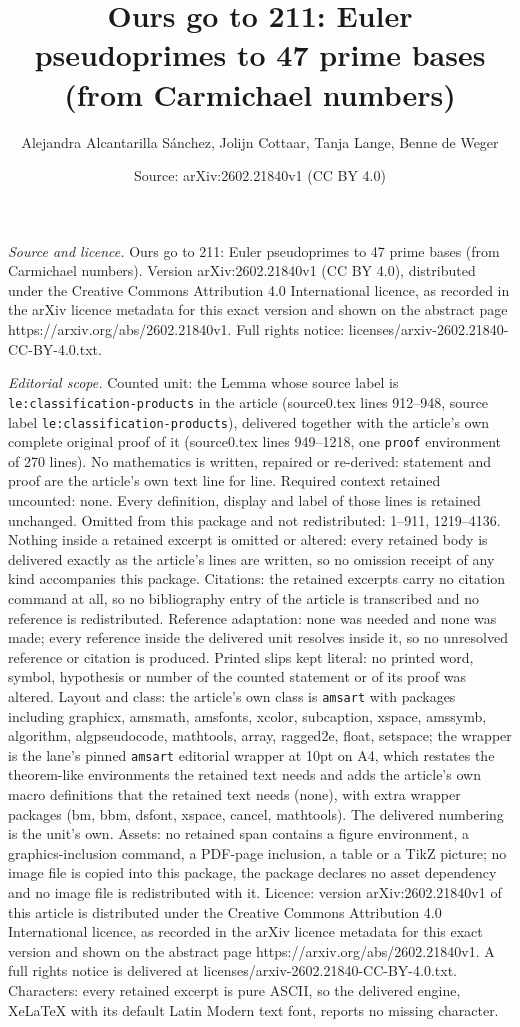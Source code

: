 \documentclass[10pt,a4paper]{amsart}
\title[Ours go to 211: Euler pseudoprimes to 47 prime bases (from C]{Ours go to 211: Euler pseudoprimes to 47 prime bases (from Carmichael numbers)}
\author{Alejandra Alcantarilla S\'anchez, Jolijn Cottaar, Tanja Lange, Benne de Weger}
\date{Source: arXiv:2602.21840v1 (CC BY 4.0)}
\begin{document}
\maketitle

\noindent\emph{Source and licence.} Ours go to 211: Euler pseudoprimes to 47 prime bases (from Carmichael numbers). Version arXiv:2602.21840v1 (CC BY 4.0), distributed under the Creative Commons Attribution 4.0 International licence, as recorded in the arXiv licence metadata for this exact version and shown on the abstract page https://arxiv.org/abs/2602.21840v1. Full rights notice: licenses/arxiv-2602.21840-CC-BY-4.0.txt.\par\smallskip

\noindent\textit{Editorial scope.} Counted unit: the Lemma whose source label is \texttt{le:classification-products} in the article (source0.tex lines 912--948, source label \texttt{le:classification-products}), delivered together with the article's own complete original proof of it (source0.tex lines 949--1218, one \texttt{proof} environment of 270 lines). No mathematics is written, repaired or re-derived: statement and proof are the article's own text line for line. Required context retained uncounted: none. Every definition, display and label of those lines is retained unchanged. Omitted from this package and not redistributed: 1--911, 1219--4136. Nothing inside a retained excerpt is omitted or altered: every retained body is delivered exactly as the article's lines are written, so no omission receipt of any kind accompanies this package. Citations: the retained excerpts carry no citation command at all, so no bibliography entry of the article is transcribed and no reference is redistributed. Reference adaptation: none was needed and none was made; every reference inside the delivered unit resolves inside it, so no unresolved reference or citation is produced. Printed slips kept literal: no printed word, symbol, hypothesis or number of the counted statement or of its proof was altered. Layout and class: the article's own class is \texttt{amsart} with packages including graphicx, amsmath, amsfonts, xcolor, subcaption, xspace, amssymb, algorithm, algpseudocode, mathtools, array, ragged2e, float, setspace; the wrapper is the lane's pinned \texttt{amsart} editorial wrapper at 10pt on A4, which restates the theorem-like environments the retained text needs and adds the article's own macro definitions that the retained text needs (none), with extra wrapper packages (bm, bbm, dsfont, xspace, cancel, mathtools). The delivered numbering is the unit's own. Assets: no retained span contains a figure environment, a graphics-inclusion command, a PDF-page inclusion, a table or a TikZ picture; no image file is copied into this package, the package declares no asset dependency and no image file is redistributed with it. Licence: version arXiv:2602.21840v1 of this article is distributed under the Creative Commons Attribution 4.0 International licence, as recorded in the arXiv licence metadata for this exact version and shown on the abstract page https://arxiv.org/abs/2602.21840v1. A full rights notice is delivered at licenses/arxiv-2602.21840-CC-BY-4.0.txt. Characters: every retained excerpt is pure ASCII, so the delivered engine, XeLaTeX with its default Latin Modern text font, reports no missing character.
\end{document}
